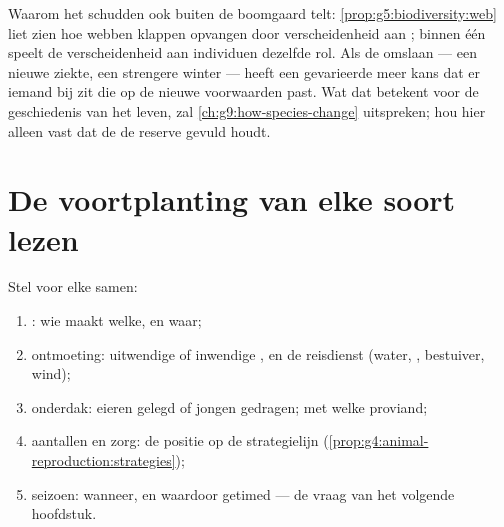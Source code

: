 \begin{remark}\label{rem:g8:sexual-reproduction:reserve}
Waarom het schudden ook buiten de boomgaard telt:
\cref{prop:g5:biodiversity:web} liet zien hoe webben klappen opvangen door
verscheidenheid aan ; binnen één  speelt de verscheidenheid
aan individuen dezelfde rol. Als de  omslaan --- een nieuwe
ziekte, een strengere winter --- heeft een gevarieerde  meer kans dat
er iemand bij zit die op de nieuwe voorwaarden past. Wat dat betekent voor
de geschiedenis van het leven, zal \cref{ch:g9:how-species-change}
uitspreken; hou hier alleen vast dat de  de
reserve gevuld houdt.
\end{remark}

\section{De voortplanting van elke soort lezen}

\begin{method}\label{met:g8:sexual-reproduction:dossier}
Stel voor elke  samen:
\begin{enumerate}
  \item {}: wie maakt welke, en waar;
  \item ontmoeting: uitwendige of inwendige , en de reisdienst
        (water, , bestuiver, wind);
  \item onderdak: eieren gelegd of jongen gedragen; met welke proviand;
  \item aantallen en zorg: de positie op de strategielijn
        (\cref{prop:g4:animal-reproduction:strategies});
  \item seizoen: wanneer, en waardoor getimed --- de vraag van het
        volgende hoofdstuk.
\end{enumerate}
\end{method}

